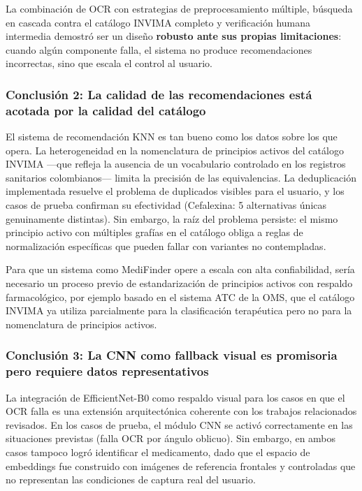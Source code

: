 La combinación de OCR con estrategias de preprocesamiento múltiple, búsqueda en cascada contra el catálogo INVIMA completo y verificación humana intermedia demostró ser un diseño \textbf{robusto ante sus propias limitaciones}: cuando algún componente falla, el sistema no produce recomendaciones incorrectas, sino que escala el control al usuario.

\subsubsection*{Conclusión 2: La calidad de las recomendaciones está acotada por la calidad del catálogo}

El sistema de recomendación KNN es tan bueno como los datos sobre los que opera. La heterogeneidad en la nomenclatura de principios activos del catálogo INVIMA ---que refleja la ausencia de un vocabulario controlado en los registros sanitarios colombianos--- limita la precisión de las equivalencias. La deduplicación implementada resuelve el problema de duplicados visibles para el usuario, y los casos de prueba confirman su efectividad (Cefalexina: 5 alternativas únicas genuinamente distintas). Sin embargo, la raíz del problema persiste: el mismo principio activo con múltiples grafías en el catálogo obliga a reglas de normalización específicas que pueden fallar con variantes no contempladas.

Para que un sistema como MediFinder opere a escala con alta confiabilidad, sería necesario un proceso previo de estandarización de principios activos con respaldo farmacológico, por ejemplo basado en el sistema ATC de la OMS, que el catálogo INVIMA ya utiliza parcialmente para la clasificación terapéutica pero no para la nomenclatura de principios activos.

\subsubsection*{Conclusión 3: La CNN como fallback visual es promisoria pero requiere datos representativos}

La integración de EfficientNet-B0 como respaldo visual para los casos en que el OCR falla es una extensión arquitectónica coherente con los trabajos relacionados revisados. En los casos de prueba, el módulo CNN se activó correctamente en las situaciones previstas (falla OCR por ángulo oblicuo). Sin embargo, en ambos casos tampoco logró identificar el medicamento, dado que el espacio de embeddings fue construido con imágenes de referencia frontales y controladas que no representan las condiciones de captura real del usuario.

